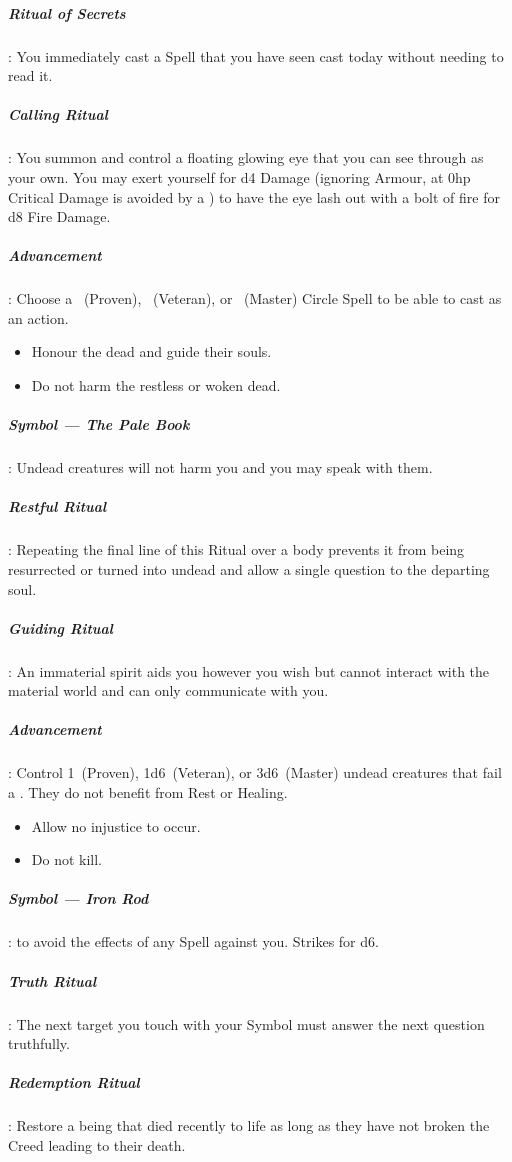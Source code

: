 \documentclass[itdr]{subfiles}
\begin{document}
\subparagraph{Ritual of Secrets}: You immediately cast a Spell that you have seen cast today without needing to read it.

\subparagraph{Calling Ritual}: You summon and control a floating glowing eye that you can see through as your own. You may exert yourself for d4 Damage (ignoring Armour, at 0hp Critical Damage is avoided by a ) to have the eye lash out with a bolt of fire for d8 Fire Damage.

\subparagraph{Advancement}: Choose a ~(Proven), ~(Veteran), or ~(Master) Circle Spell to be able to cast as an action.

\vspace{2ex}

{\em\begin{itemize}
		\item Honour the dead and guide their souls.
		\item Do not harm the restless or woken dead.
\end{itemize}}

\subparagraph{Symbol --- The Pale Book}: Undead creatures will not harm you and you may speak with them.

\subparagraph{Restful Ritual}: Repeating the final line of this Ritual over a body prevents it from being resurrected or turned into undead and allow a single question to the departing soul.

\subparagraph{Guiding Ritual}: An immaterial spirit aids you however you wish but cannot interact with the material world and can only communicate with you.

\subparagraph{Advancement}: Control 1~(Proven), 1d6~(Veteran), or 3d6~(Master) undead creatures that fail a . They do not benefit from Rest or Healing.

\vfill
\break

{\em\begin{itemize}
		\item Allow no injustice to occur.
		\item Do not kill.
\end{itemize}}

\subparagraph{Symbol --- Iron Rod}:  to avoid the effects of any Spell against you. Strikes for d6.

\subparagraph{Truth Ritual}: The next target you touch with your Symbol must answer the next question truthfully.

\subparagraph{Redemption Ritual}: Restore a being that died recently to life as long as they have not broken the Creed leading to their death.
\end{document}
